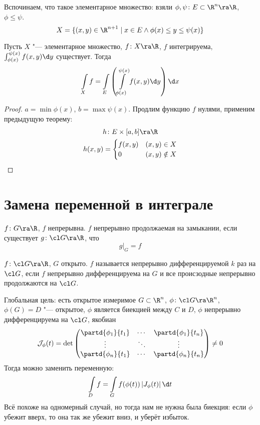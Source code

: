 \begin{Rem}
	Вспочинаем, что такое элементарное множество: взяли $\phi, \psi\colon E \subset \R^n \ra \R$, $\phi \le \psi$.
	\[ X = \{ (x, y) \in \R^{n+1} \mid x \in E \land \phi(x) \le y \le \psi(x)\} \]
\end{Rem}
\begin{theorem}
	Пусть $X$ "--- элементарное множество, $f\colon X \ra \R$, $f$ интегрируема, $\int_{\phi(x)}^{\psi(x)} f(x, y) \d y$ существует.
	Тогда
	\[ \int\limits_X f = \int\limits_E \left( \int\limits_{\phi(x)}^{\psi(x)} f(x, y) \d y \right) \d x \]
\end{theorem}
\begin{proof}
	$a = \min \phi(x)$, $b = \max \psi(x)$.
	Продлим функцию $f$ нулями, применим предыдущую теорему:
	\begin{gather*}
		h\colon E \times [a, b] \ra \R \\
		h(x, y) = \begin{cases} f(x, y) & (x, y) \in X \\ 0 & (x, y) \notin X \end{cases}
	\end{gather*}
\end{proof}

\section{Замена переменной в интеграле}

\begin{Def}
	$f\colon G \ra \R$, $f$ непрерывна.
	$f$ непрерывно продолжаемая на замыкании, если существует $g\colon \cl G \ra \R$, что
	\[ g \biggr|_G = f \]
\end{Def}

\begin{Def}
	$f\colon \cl G \ra \R$, $G$ открыто.
	$f$ называется непрерывно дифференцируемой $k$ раз на $\cl G$,
	если $f$ непрерывно дифференцируема на $G$ и все происзодные непрерывно продолжаются на $\cl G$.
\end{Def}

Глобальная цель: есть открытое измеримое $G \subset \R^n$, $\phi\colon \cl G \ra \R^n$,
$\phi(G) = D$ "--- открытое, $\phi$ является биекцией между $C$ и $D$, $\phi$ непрерывно дифференцируема на $\cl G$,
якобиан
\[	\mathcal J_\phi(t) = \det \begin{pmatrix}
		\partd{\phi_1}{t_1} & \cdots & \partd{\phi_1}{t_n} \\
		\vdots & \ddots & \vdots \\
		\partd{\phi_n}{t_1} & \cdots & \partd{\phi_n}{t_n}
	\end{pmatrix} \ne 0
\]
Тогда можно заменить переменную:
\[
	\int\limits_D f = \int\limits_G f(\phi(t)) \left| J_\phi(t) \right| \d t
\]
Всё похоже на одномерный случай, но тогда нам не нужна была биекция: если $\phi$ убежит вверх, то она так же убежит вниз, и уберёт избыток.
